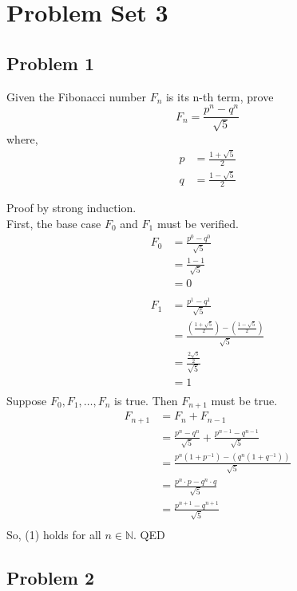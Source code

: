 \documentclass{article}
\begin{document}
\section*{Problem Set 3}

\subsection*{Problem 1}

\noindent
Given the Fibonacci number $F_n$ is its n-th term, prove
\begin{equation}
    F_n = \frac{p^n - q^n}{\sqrt{5}}
\end{equation}
where,
\begin{align}
    p &= \frac{1+\sqrt{5}}{2}\\
    q &= \frac{1-\sqrt{5}}{2}
\end{align}

\noindent
Proof by strong induction.\\
First, the base case $F_0$ and $F_1$ must be verified.
\begin{align*}
    F_0 &= \frac{p^0 - q^0}{\sqrt{5}}\\
        &= \frac{1 - 1}{\sqrt{5}}\\
        &= 0\\
        \\
    F_1 &= \frac{p^1 - q^1}{\sqrt{5}}\\
        &= \frac{ (\frac{1+\sqrt{5}}{2}) - (\frac{1-\sqrt{5} }{2})}{\sqrt{5}}\\
        &= \frac{\frac{2\sqrt{5}}{2}}{\sqrt{5}}\\
        &= 1\\
\end{align*}
Suppose $F_0,F_1,\ldots,F_n$ is true. Then $F_{n+1}$ must be true.
\begin{align*}
    F_{n+1} &= F_n + F_{n-1}\\
            &= \frac{p^n - q^n}{\sqrt{5}} + \frac{p^{n-1} - q^{n-1}}{\sqrt{5}}\\
            &= \frac{p^n(1+p^{-1}) - (q^n(1+q^{-1}))}{\sqrt{5}}\\
            &= \frac{p^n \cdot p - q^n \cdot q}{\sqrt{5}}\\
            &= \frac{p^{n+1} - q^{n+1}}{\sqrt{5}}\\
\end{align*}
So, (1) holds for all $n \in \mathbb{N}$. QED

\subsection*{Problem 2}
\end{document}
